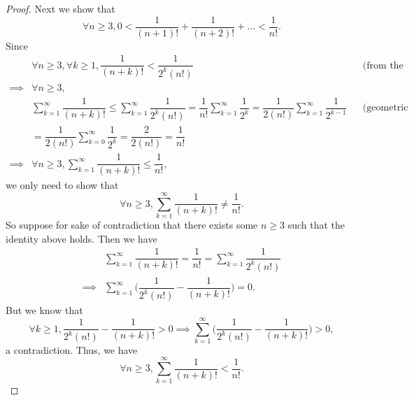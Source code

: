 \begin{proof}
  Next we show that
  \[
    \forall n \geq 3, 0 < \dfrac{1}{(n + 1)!} + \dfrac{1}{(n + 2)!} + \dots < \dfrac{1}{n!}.
  \]
  Since
  \begin{align*}
             & \forall n \geq 3, \forall k \geq 1, \dfrac{1}{(n + k)!} < \dfrac{1}{2^k (n!)}                                                                                                                        &  & \text{(from the proof above)} \\
    \implies & \forall n \geq 3,                                                                                                                                                                                                                       \\
             & \sum_{k = 1}^\infty \dfrac{1}{(n + k)!} \leq \sum_{k = 1}^\infty \dfrac{1}{2^k (n!)} = \dfrac{1}{n!} \sum_{k = 1}^\infty \dfrac{1}{2^k} = \dfrac{1}{2 (n!)} \sum_{k = 1}^\infty \dfrac{1}{2^{k - 1}} &  & \text{(geometric series)}     \\
             & = \dfrac{1}{2 (n!)} \sum_{k = 0}^\infty \dfrac{1}{2^k} = \dfrac{2}{2 (n!)} = \dfrac{1}{n!}                                                                                                                                              \\
    \implies & \forall n \geq 3, \sum_{k = 1}^\infty \dfrac{1}{(n + k)!} \leq \dfrac{1}{n!},
  \end{align*}
  we only need to show that
  \[
    \forall n \geq 3, \sum_{k = 1}^\infty \dfrac{1}{(n + k)!} \neq \dfrac{1}{n!}.
  \]
  So suppose for sake of contradiction that there exists some \(n \geq 3\) such that the identity above holds.
  Then we have
  \begin{align*}
             & \sum_{k = 1}^\infty \dfrac{1}{(n + k)!} = \dfrac{1}{n!} = \sum_{k = 1}^\infty \dfrac{1}{2^k (n!)} \\
    \implies & \sum_{k = 1}^\infty \bigg(\dfrac{1}{2^k (n!)} - \dfrac{1}{(n + k)!}\bigg) = 0.
  \end{align*}
  But we know that
  \[
    \forall k \geq 1, \dfrac{1}{2^k (n!)} - \dfrac{1}{(n + k)!} > 0 \implies \sum_{k = 1}^\infty \bigg(\dfrac{1}{2^k (n!)} - \dfrac{1}{(n + k)!}\bigg) > 0,
  \]
  a contradiction.
  Thus, we have
  \[
    \forall n \geq 3, \sum_{k = 1}^\infty \dfrac{1}{(n + k)!} < \dfrac{1}{n!}.
  \]


\end{proof}
